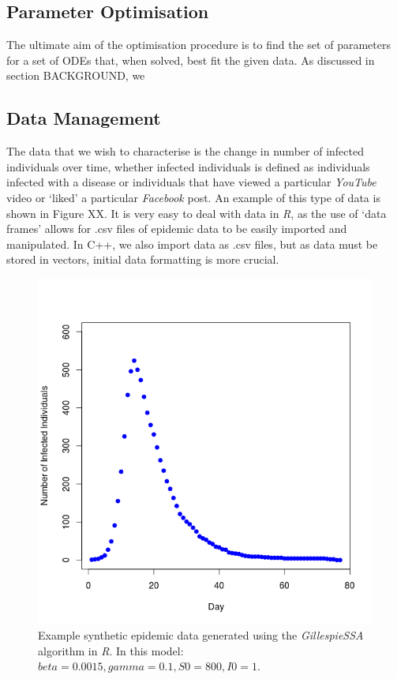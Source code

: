 \documentclass[11pt, a4paper, oneside,titlepage]{article}
\begin{document}
\subsection{Parameter Optimisation}
The ultimate aim of the optimisation procedure is to find the set of parameters for a set of
ODEs that, when solved, best fit the given data. As discussed in
section BACKGROUND, we 

\subsection{Data Management}
The data that we wish to characterise is the change in number of
infected individuals over time, whether infected individuals is
defined as individuals infected with a disease or individuals that
have viewed a particular \emph{YouTube} video or `liked' a particular
\emph{Facebook} post. An example of this type of data is shown in
Figure XX. It is very easy to deal with data in \emph{R}, as the use
of `data frames' allows for .csv files of epidemic data to be easily
imported and manipulated. In C++, we also import data as .csv files,
but as data must be stored in vectors, initial data formatting is more crucial.

\begin{center}
\begin{figure}[ht!]

\includegraphics[width=15cm]{simplesir.png}
\caption{Example synthetic epidemic data generated using the
  \emph{GillespieSSA} algorithm in \emph{R}. In this model: $beta =
  0.0015, gamma = 0.1, S0 = 800, I0 = 1$.}
\end{figure}  
\end{center}
\end{document}
